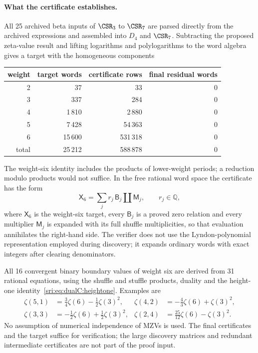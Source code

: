 \paragraph{What the certificate establishes.} All 25 archived beta inputs of $\CSR_3$ to $\CSR_7$ are parsed
directly from the archived expressions and assembled into $D_4$ and $\CSR_7$. Subtracting the proposed zeta-value result and lifting
logarithms and polylogarithms to the word algebra gives a target with the homogeneous components
\begin{center}\small
\begin{tabular}{@{}rrrr@{}}
\toprule
weight & target words & certificate rows & final residual words\\
\midrule
2 & 37 & 33 & 0\\
3 & 337 & 284 & 0\\
4 & 1\,810 & 2\,880 & 0\\
5 & 7\,428 & 54\,363 & 0\\
6 & 15\,600 & 531\,318 & 0\\
\midrule
total & 25\,212 & 588\,878 & 0\\
\bottomrule
\end{tabular}
\end{center}
The weight-six identity includes the products of lower-weight periods; a reduction modulo products would not suffice.
In the free rational word space the certificate has the form
\begin{equation}
 \mathsf X_6=\sum_jr_j\,\mathsf B_j\mathbin{\amalg}\mathsf M_j,\qquad r_j\in\mathbb Q,
\end{equation}
where $\mathsf X_6$ is the weight-six target, every $\mathsf B_j$ is a proved zero relation and every multiplier
$\mathsf M_j$ is expanded with its full shuffle multiplicities, so that evaluation annihilates the right-hand side. The
verifier does not use the Lyndon-polynomial representation employed during discovery; it expands ordinary words with
exact integers after clearing denominators.

All 16 convergent binary boundary values of weight six are derived from 31 rational equations, using the shuffle and
stuffle products, duality and the height-one identity~\eqref{sri:eq:dualC:heightone}. Examples are
\begin{equation}
\begin{aligned}
 \zeta(5,1)&=\tfrac34\zeta(6)-\tfrac12\zeta(3)^2, & \zeta(4,2)&=-\tfrac43\zeta(6)+\zeta(3)^2,\\
 \zeta(3,3)&=-\tfrac12\zeta(6)+\tfrac12\zeta(3)^2, & \zeta(2,4)&=\tfrac{25}{12}\zeta(6)-\zeta(3)^2.
\end{aligned}
\end{equation}
No assumption of numerical independence of MZVs is used. The final certificates and the target suffice for
verification; the large discovery matrices and redundant intermediate certificates are not part of the proof input.

